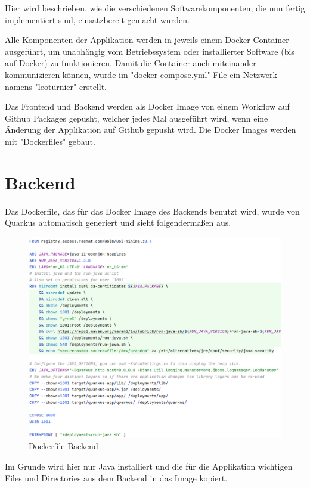Hier wird beschrieben, wie die verschiedenen Softwarekomponenten, die nun fertig implementiert sind, einsatzbereit gemacht wurden.

Alle Komponenten der Applikation werden in jeweils einem Docker Container ausgeführt, um unabhängig vom Betriebssystem oder installierter Software (bis auf Docker) zu funktionieren. 
Damit die Container auch miteinander kommunizieren können, wurde im "docker-compose.yml" File ein Netzwerk namens "leoturnier" erstellt.

Das Frontend und Backend werden als Docker Image von einem Workflow auf Github Packages gepusht, welcher jedes Mal ausgeführt wird, wenn eine Änderung der Applikation auf Github gepusht wird.
Die Docker Images werden mit "Dockerfiles" gebaut. 

\section{Backend}

Das Dockerfile, das für das Docker Image des Backends benutzt wird, wurde von Quarkus automatisch generiert und sieht folgendermaßen aus. 

\begin{figure}[H]
    \includegraphics[scale=0.44]{pics/docker/dockerfile_backend.png}
    \caption{Dockerfile Backend}
\end{figure}

Im Grunde wird hier nur Java installiert und die für die Applikation wichtigen Files und Directories aus dem Backend in das Image kopiert.

